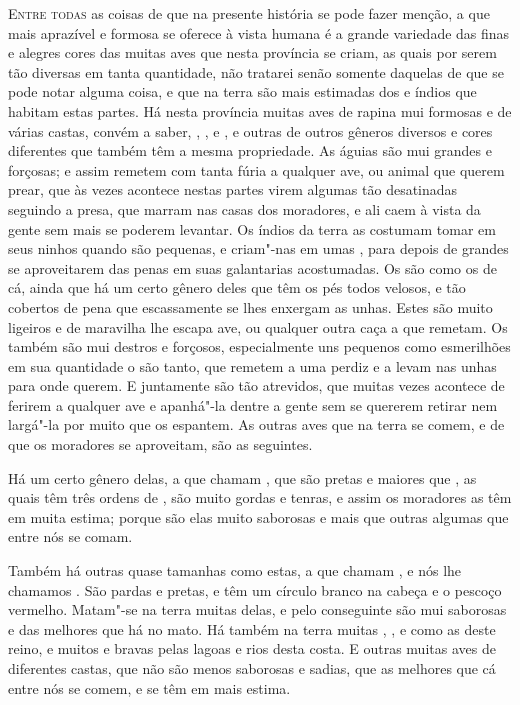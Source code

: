 \noindent\textsc{Entre todas} as coisas de que na presente história se pode fazer menção,
a que mais aprazível e formosa se oferece à vista humana é a grande
variedade das finas e alegres cores das muitas aves que nesta província
se criam, as quais por serem tão diversas em tanta quantidade, não
tratarei senão somente daquelas de que se pode notar alguma coisa, e que
na terra são mais estimadas dos  e índios que habitam estas
partes.
Há nesta província muitas aves de rapina mui formosas e de várias
castas, convém a saber, , , e , e outras de outros
gêneros diversos e cores diferentes que também têm a mesma propriedade.
As águias são mui grandes e forçosas; e assim remetem com tanta fúria a
qualquer ave, ou animal que querem prear, que às vezes acontece nestas
partes virem algumas tão desatinadas seguindo a presa, que marram nas
casas dos moradores, e ali caem à vista da gente sem mais se poderem
levantar. Os índios da terra as costumam tomar em seus ninhos quando			%
são pequenas, e criam"-nas em umas , para depois de grandes se aproveitarem 
das penas em suas galantarias
acostumadas. Os  são como os de cá, ainda que há um certo gênero
deles que têm os pés todos velosos, e tão cobertos de pena que
escassamente se lhes enxergam as unhas. Estes são muito ligeiros e de
maravilha lhe escapa ave, ou qualquer outra caça a que remetam. Os
 também são mui destros e forçosos, especialmente uns pequenos
como esmerilhões em sua quantidade o são tanto, que remetem a uma perdiz
e a levam nas unhas para onde querem. E juntamente são tão atrevidos,
que muitas vezes acontece de ferirem a qualquer ave e apanhá"-la dentre a
gente sem se quererem retirar nem largá"-la por muito que os espantem.
As outras aves que na terra se comem, e de que os moradores se
aproveitam, são as seguintes.

Há um certo gênero delas, a que chamam , que são pretas e
maiores que , as quais têm três ordens de , são muito
gordas e tenras, e assim os moradores as têm em muita estima; porque são
elas muito saborosas e mais que outras algumas que entre nós se comam.

Também há outras quase tamanhas como estas, a que chamam , e nós
lhe chamamos . São pardas e pretas, e têm um círculo
branco na cabeça e o pescoço vermelho. Matam"-se na terra muitas delas,
e pelo conseguinte são mui saborosas e das melhores que há no mato. Há
também na terra muitas , , e  como as deste reino, e
muitos  e  bravas pelas
lagoas e rios desta costa. E outras muitas aves de diferentes castas,
que não são menos saborosas e sadias, que as melhores que cá entre nós \EP
se comem, e se têm em mais estima.

